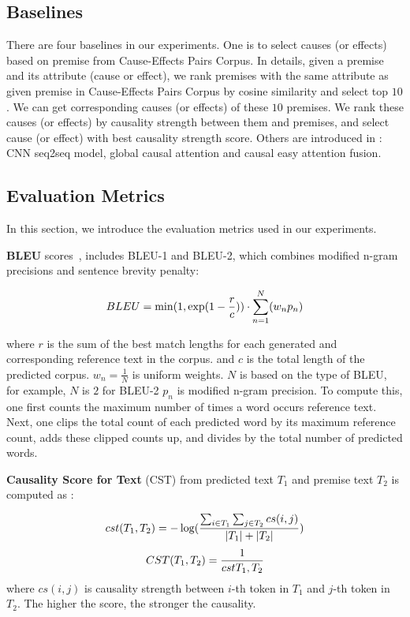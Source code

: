\subsection{Baselines}
There are four baselines in our experiments.
One is to select causes (or effects) based on premise 
from Cause-Effects Pairs Corpus. 
In details, given a premise and its attribute (cause or effect), 
we rank premises with the same attribute as given premise
in Cause-Effects Pairs Corpus by cosine similarity 
and select top $10$. We can get corresponding causes (or effects)
of these $10$ premises. We rank these causes (or effects) by
causality strength between them and premises, and select cause (or effect)
with best causality strength score.
Others are introduced in :
CNN seq2seq model, global causal attention and
causal easy attention fusion. 



\subsection{Evaluation Metrics}
In this section, we introduce the evaluation metrics used in 
our experiments.

\textbf{BLEU} scores~\cite{PapineniRWZ02}, includes BLEU-1 and BLEU-2,
which combines modified n-gram precisions and sentence brevity penalty:

\begin{equation}
\small BLEU = \min(1,\exp(1-\frac{r}{c})) \cdot \sum_{n=1}^{N}(w_{n}p_{n})
\end{equation}

where $r$ is the sum of the best match lengths 
for each generated and corresponding reference text in the corpus.
and $c$ is the total length of the predicted corpus. 
$w_n=\frac{1}{N}$ is uniform weights. $N$ is based on the type of BLEU, 
for example, $N$ is $2$ for BLEU-2
$p_n$ is modified n-gram precision. To compute this, 
one first counts the maximum number of times a word occurs reference text. 
Next, one clips the total count of each predicted word by its maximum
reference count, adds these clipped counts up, and
divides by the total number of predicted words. 

\textbf{Causality Score for Text} (CST) from predicted text $T_1$
and premise text $T_2$ is computed as \cite{LuoSZHW16}:

\begin{equation}
\small cst(T_{1},T_{2}) = -\log(\frac{\sum_{i \in T_{1}}\sum_{j \in T_{2}}cs(i,j)}{\left| T_{1} \right| + \left| T_{2} \right|})
\end{equation}
\begin{equation}
\small CST(T_{1},T_{2}) = \frac{1}{cst{T_1,T_2}}
\end{equation}
where $cs(i,j)$ is causality strength 
between $i$-th token in $T_1$ and $j$-th token in $T_2$. 
The higher the score, the stronger the causality.


